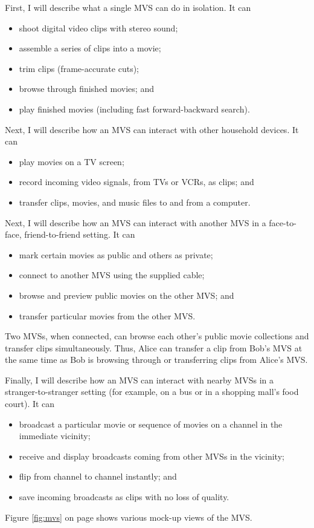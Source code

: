 \documentclass[12pt]{article}
\begin{document}
First, I will describe what a single MVS can do in isolation.
It can
\begin{itemize}
\item shoot digital video clips with stereo sound;
\item assemble a series of clips into a movie;
\item trim clips (frame-accurate cuts);
\item browse through finished movies; and
\item play finished movies (including fast forward-backward search).
\end{itemize}
Next, I will describe how an MVS can interact with other household devices.
It can
\begin{itemize}
\item play movies on a TV screen;
\item record incoming video signals, from TVs or VCRs, as clips; and
\item transfer clips, movies, and music files to and from a computer.
\end{itemize}
Next, I will describe how an MVS can interact with another MVS in a face-to-face, friend-to-friend setting.
It can
\begin{itemize}
\item mark certain movies as public and others as private;
\item connect to another MVS using the supplied cable;
\item browse and preview public movies on the other MVS; and
\item transfer particular movies from the other MVS.
\end{itemize}
Two MVSs, when connected, can browse each other's public movie collections and transfer clips simultaneously.
Thus, Alice can transfer a clip from Bob's MVS at the same time as Bob is browsing through or transferring clips from Alice's MVS.

Finally, I will describe how an MVS can interact with nearby MVSs in a stranger-to-stranger setting (for example, on a bus or in a shopping mall's food court).
It can
\begin{itemize}
\item broadcast a particular movie or sequence of movies on a channel in the immediate vicinity;
\item receive and display broadcasts coming from other MVSs in the vicinity;
\item flip from channel to channel instantly; and
\item save incoming broadcasts as clips with no loss of quality.
\end{itemize}
Figure \ref{fig:mvs} on page \pageref{fig:mvs} shows various mock-up views of the MVS.
\end{document}
